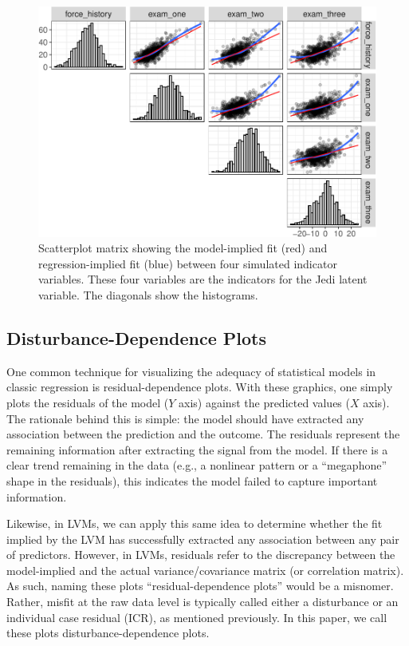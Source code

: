 \documentclass[
  english,
  man]{apa6}
\begin{document}
\begin{figure}

{\centering \includegraphics[width=0.9\linewidth]{flexplavaan_draft_files/figure-latex/trailMatrix2-1} 

}

\caption{Scatterplot matrix showing the model-implied fit (red) and regression-implied fit (blue) between four simulated indicator variables. These four variables are the indicators for the Jedi latent variable. The diagonals show the histograms.}\label{fig:trailMatrix2}
\end{figure}

\hypertarget{disturbance-dependence-plots}{%
\subsection{Disturbance-Dependence Plots}\label{disturbance-dependence-plots}}

One common technique for visualizing the adequacy of statistical models in classic regression is residual-dependence plots. With these graphics, one simply plots the residuals of the model (\(Y\) axis) against the predicted values (\(X\) axis). The rationale behind this is simple: the model should have extracted any association between the prediction and the outcome. The residuals represent the remaining information after extracting the signal from the model. If there is a clear trend remaining in the data (e.g., a nonlinear pattern or a ``megaphone'' shape in the residuals), this indicates the model failed to capture important information.

Likewise, in LVMs, we can apply this same idea to determine whether the fit implied by the LVM has successfully extracted any association between any pair of predictors. However, in LVMs, residuals refer to the discrepancy between the model-implied and the actual variance/covariance matrix (or correlation matrix). As such, naming these plots ``residual-dependence plots'' would be a misnomer. Rather, misfit at the raw data level is typically called either a disturbance or an individual case residual (ICR), as mentioned previously. In this paper, we call these plots disturbance-dependence plots.
\end{document}
